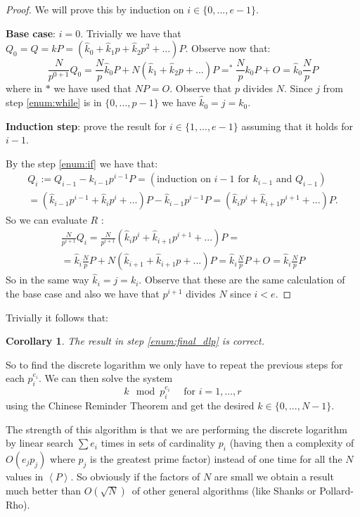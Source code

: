\documentclass{article}
\DeclareMathOperator*{\eqb}{=}
\theoremstyle{plain}
\newtheorem{cor}[teo]{Corollary}
\theoremstyle{remark}
\theoremstyle{definition}
\begin{document}
\begin{proof}
	We will prove this by induction on $i \in \{ 0 ,..., e-1\}$.

	\textbf{Base case}: $i=0$. Trivially we have that $Q_0 = Q = kP = (\hat{k}_0 + \hat{k}_1p + \hat{k}_2p^2 + ...)P$. Observe now that:
	\begin{equation}
		\label{eq:prop:base}
		\frac{N}{p^{0+1}}Q_0 = \frac{N}{p}\hat{k}_0 P + N(\hat{k}_1 + \hat{k}_2p + ...)P \eqb^* \frac{N}{p}k_0 P + O = \hat{k}_0 \frac{N}{p} P
	\end{equation}
	where in $*$ we have used that $NP = O$. Observe that $p$ divides $N$. Since $j$ from step \ref{enum:while} is in $\{0,...,p-1\}$ we have $\hat{k}_0 = j = k_0$.

	\textbf{Induction step}: prove the result for $i \in \{1,...,e-1\}$ assuming that it holds for $i-1$. 

	By the step \ref{enum:if} we have that:
	\begin{multline*}
		Q_i := Q_{i-1} - k_{i-1} p^{i-1}P = (\text{induction on }i-1\text{ for } k_{i-1} \text{ and } Q_{i-1}) \\
		= (\hat{k}_{i-1}p^{i-1} + \hat{k}_{i}p^{i} + ... )P - \hat{k}_{i-1} p^{i-1}P = (\hat{k}_ip^i + \hat{k}_{i+1}p^{i+1} + ... )P.
	\end{multline*}
	So we can evaluate $R$ :
	\begin{multline*}
		\frac{N}{p^{i+1}}Q_i = \frac{N}{p^{i+1}}(\hat{k}_ip^i + \hat{k}_{i+1}p^{i+1} + ... )P = \\
		= \hat{k}_i \frac{N}{p} P + N(\hat{k}_{i+1} + \hat{k}_{i+1}p + ...)P= \hat{k}_i \frac{N}{p} P + O = \hat{k}_i \frac{N}{p} P 
	\end{multline*}
	So in the same way $\hat{k}_i = j = k_i$. Observe that these are the same calculation of the base case and also we have that $p^{i+1}$ divides $N$ since $i<e$. 
\end{proof}

Trivially it follows that:

\begin{cor}
	The result in step \ref{enum:final_dlp} is correct.
\end{cor}

So to find the discrete logarithm we only have to repeat the previous steps for each $p_i^{e_i}$. We can then solve the system 
\[
	k \mod p_i^{e_i} \quad \text{ for } i=1,...,r
\]
using the Chinese Reminder Theorem and get the desired $k \in \{0,...,N-1\}$. 

The strength of this algorithm is that we are performing the discrete logarithm by linear search $\sum e_i$ times in sets of cardinality $p_i$ (having then a complexity of $O(e_j p_j)$ where $p_j$ is the greatest prime factor) instead of one time for all the $N$ values in $\left< P \right>$. So obviously if the factors of $N$ are small we obtain a result much better than $O(\sqrt{N})$ of other general algorithms (like Shanks or Pollard-Rho). 
\end{document}

